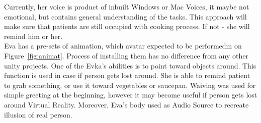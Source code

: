 \documentclass[18pt]{article}
\numberwithin{equation}{section} %
\numberwithin{figure}{section} %
\numberwithin{table}{section} %
\begin{document}
			Currently, her voice is product of inbuilt Windows or Mac Voices, it maybe not emotional, but contains general understanding of the tasks. This approach will make sure that patients are still occupied with cooking process. If not - she will remind him or her. \\	
			
			Eva has a pre-sets of animation, which avatar expected to be performedm on Figure~\ref{fig:animat}. Process of installing them has no difference from any other unity projects. One of the Evka's abilities is to point toward objects around. This function is used in case if person gets lost around. She is able to remind patient to grab something, or use it toward vegetables or saucepan. Waiving was used for simple greeting at the beginning, however it may become useful if person gets lost around Virtual Reality. Moreover, Eva's body used as Audio Source to recreate illusion of real person. \\
\end{document}
